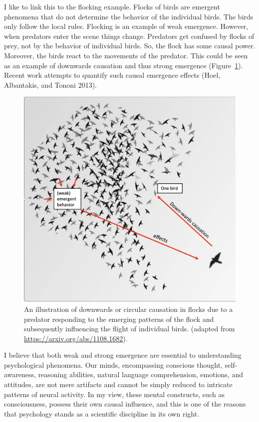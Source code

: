 \documentclass[
  a4paper,
  DIV=11,
  numbers=noendperiod,
  oneside]{scrreprt}
\begin{document}
I like to link this to the flocking example. Flocks of birds are
emergent phenomena that do not determine the behavior of the individual
birds. The birds only follow the local rules. Flocking is an example of
weak emergence. However, when predators enter the scene things change.
Predators get confused by flocks of prey, not by the behavior of
individual birds. So, the flock has some causal power. Moreover, the
birds react to the movements of the predator. This could be seen as an
example of downwards causation and thus strong emergence
(Figure~\ref{fig-ch1-img4}). Recent work attempts to quantify such
causal emergence effects (Hoel, Albantakis, and Tononi 2013).

\begin{figure}

{\centering \includegraphics{media/ch1/image4.jpg}

}

\caption{\label{fig-ch1-img4}An illustration of downwards or circular
causation in flocks due to a predator responding to the emerging
patterns of the flock and subsequently influencing the flight of
individual birds. (adapted from \url{https://arxiv.org/abs/1108.1682}).}

\end{figure}

I believe that both weak and strong emergence are essential to
understanding psychological phenomena. Our minds, encompassing conscious
thought, self-awareness, reasoning abilities, natural language
comprehension, emotions, and attitudes, are not mere artifacts and
cannot be simply reduced to intricate patterns of neural activity. In my
view, these mental constructs, such as consciousness, possess their own
causal influence, and this is one of the reasons that psychology stands
as a scientific discipline in its own right.
\end{document}
